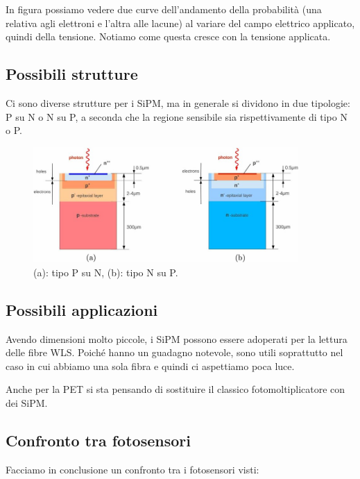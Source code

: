 In figura possiamo vedere due curve dell'andamento della probabilità (una relativa agli elettroni e l'altra alle lacune) al variare del campo elettrico applicato, quindi della tensione. Notiamo come questa cresce con la tensione applicata.

\subsection{Possibili strutture}
Ci sono diverse strutture per i SiPM, ma in generale si dividono in due tipologie: P su N o N su P, a seconda che la regione sensibile sia rispettivamente di tipo N o P.

\begin{figure}[H]
   \centering
   \includegraphics[width=0.9\textwidth]{immagini/strutture_SiPM.png}
   \caption*{(a): tipo P su N, (b): tipo N su P.}
\end{figure}

\subsection{Possibili applicazioni}

Avendo dimensioni molto piccole, i SiPM possono essere adoperati per la lettura delle fibre WLS. Poiché hanno un guadagno notevole, sono utili soprattutto nel caso in cui abbiamo una sola fibra e quindi ci aspettiamo poca luce.

Anche per la PET si sta pensando di sostituire il classico fotomoltiplicatore con dei SiPM.

\subsection{Confronto tra fotosensori}

Facciamo in conclusione un confronto tra i fotosensori visti:

